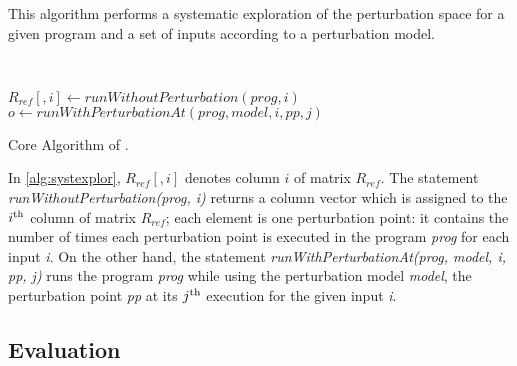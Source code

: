 This algorithm performs a systematic exploration of the perturbation space for a given program and a set of inputs according to a perturbation model.

\begin{algorithm}[h]
	\\
	\begin{algorithmic}
				\State $R_{ref}[,i] \leftarrow runWithoutPerturbation(prog, i)$
					\State $o \leftarrow runWithPerturbationAt(prog,model,i,pp,j)$
					\Else 
					\EndIf
				\EndFor
			\EndFor
		\EndFor
	\end{algorithmic}
	\caption{Core Algorithm of \perturb.}
	\label{alg:systexplor}
\end{algorithm}

In \autoref{alg:systexplor}, $R_{ref}[,i]$ denotes column $i$ of matrix $R_{ref}$. 
The statement \emph{runWithoutPerturbation(prog, i)} returns a column vector which is assigned to the $i^{\mbox{\scriptsize th}}$ column of matrix $R_{ref}$; each element is one perturbation point: it contains the number of times each perturbation point is executed in the program \emph{prog} for each input \emph{i}. 
On the other hand, the statement \emph{runWithPerturbationAt(prog, model, i, pp, j)} runs the program \emph{prog} while using the perturbation model \emph{model}, the perturbation point \emph{pp} at its $j^{\mbox{\scriptsize th}}$ execution for the given input \emph{i}.

\subsection{Evaluation}
\label{subsec:transversal-contributions:correctness:experimentation}

